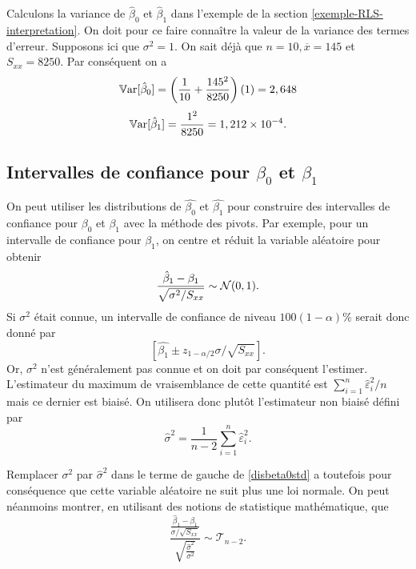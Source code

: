 \begin{exemple}
Calculons la variance de $\hat\beta_0$ et $\hat\beta_1$ dans l'exemple de la section \ref{exemple-RLS-interpretation}. On doit pour ce faire connaître la valeur de la variance des termes d'erreur. Supposons ici que $\sigma^2=1$. On sait déjà que $n=10,\overline x=145$ et $S_{xx}=8250$. Par conséquent on a
$$\mathbb{V}\text{ar}[\hat\beta_0]=\left( \frac{1}{10}+\frac{145^2}{8250} \right)(1)=2,648$$
$$\mathbb{V}\text{ar}[\hat\beta_1]=\frac{1^2}{8250}=1,212\times 10^{-4}.$$
\end{exemple}



\subsection{Intervalles de confiance pour $\beta_0$ et $\beta_1$}
\label{sec:IntervallesDeConfiance}

On peut utiliser les distributions de $\hat{\beta_0}$ et $\hat{\beta_1}$ pour construire des intervalles de confiance pour $\beta_0$ et $\beta_1$ avec la méthode des pivots. Par exemple, pour un intervalle de confiance pour $\beta_1$, on centre et réduit la variable aléatoire pour obtenir
\begin{equation}
\frac{\hat{\beta}_1-\beta_1}{\sqrt{\sigma^2/S_{xx}}}\sim \mathcal{N}(0,1).
\label{disbeta0std}
\end{equation}
\vspace{-0.05 in}
Si $\sigma^2$ était connue, un intervalle de confiance de niveau $100(1-\alpha)\%$ serait donc donné par $$[\hat{\beta_1}\pm z_{1-\alpha/2} \sigma / \sqrt{S_{xx}}].$$ Or, $\sigma^2$ n'est généralement pas connue et on doit par conséquent l'estimer. L'estimateur du maximum de vraisemblance de cette quantité est $\sum_{i=1}^n \hat{\varepsilon}_i^2 /n$ mais ce dernier est biaisé.
On utilisera donc plutôt l'estimateur non biaisé défini par $$\hat{\sigma}^2=  \frac{1}{n-2} \sum_{i=1}^n \hat{\varepsilon}_i^2.$$

\vspace{-0.05 in}
Remplacer $\sigma^2$ par $\hat\sigma^2$ dans le terme de gauche de \ref{disbeta0std} a toutefois pour conséquence que cette variable aléatoire ne suit plus une loi normale. On peut néanmoins montrer, en utilisant des notions de statistique mathématique, que
\begin{equation}
 \frac{\frac{\hat{\beta}_1-\beta_1}{\sigma/\sqrt{S_{xx}}}}
 {  \sqrt{\frac{\hat\sigma^2}{\sigma^2} } } \sim \mathcal{T}_{n-2}.
\label{disbeta0stds}
\end{equation}


